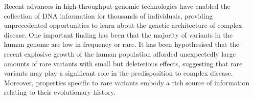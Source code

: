 
\singlespacing



Recent advances in high-throughput genomic technologies have enabled the collection of DNA information for thousands of individuals, providing unprecedented opportunities to learn about the genetic architecture of complex disease.
One important finding has been that the majority of variants in the human genome are low in frequency or rare.
It has been hypothesised that the recent explosive growth of the human population afforded unexpectedly large amounts of rare variants with small but deleterious effects, suggesting that rare variants may play a significant role in the predisposition to complex disease.
Moreover, properties specific to rare variants embody a rich source of information relating to their evolutionary history.

